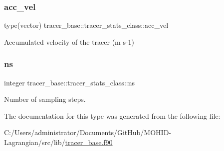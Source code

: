 \subsubsection{\texorpdfstring{acc\+\_\+vel}{acc\_vel}}
{\footnotesize\ttfamily type(vector) tracer\+\_\+base\+::tracer\+\_\+stats\+\_\+class\+::acc\+\_\+vel\hspace{0.3cm}{\ttfamily [private]}}



Accumulated velocity of the tracer (m s-\/1) 

\mbox{\label{structtracer__base_1_1tracer__stats__class_a77e72ef1bc36c7b337f2d1b199010e81}} 
\subsubsection{\texorpdfstring{ns}{ns}}
{\footnotesize\ttfamily integer tracer\+\_\+base\+::tracer\+\_\+stats\+\_\+class\+::ns\hspace{0.3cm}{\ttfamily [private]}}



Number of sampling steps. 



The documentation for this type was generated from the following file\+:\begin{DoxyCompactItemize}
\item 
C\+:/\+Users/administrator/\+Documents/\+Git\+Hub/\+M\+O\+H\+I\+D-\/\+Lagrangian/src/lib/\hyperlink{tracer__base_8f90}{tracer\+\_\+base.\+f90}\end{DoxyCompactItemize}
